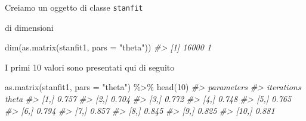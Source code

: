 \documentclass[
  10pt,
  italian,
  a4paper,
  extrafontsizes,onecolumn,openright
  ]{memoir}
\newenvironment{Shaded}{\begin{snugshade}}{\end{snugshade}}
\newcommand{\AttributeTok}[1]{\textcolor[rgb]{0.77,0.63,0.00}{#1}}
\newcommand{\CommentTok}[1]{\textcolor[rgb]{0.56,0.35,0.01}{\textit{#1}}}
\newcommand{\DecValTok}[1]{\textcolor[rgb]{0.00,0.00,0.81}{#1}}
\newcommand{\FunctionTok}[1]{\textcolor[rgb]{0.00,0.00,0.00}{#1}}
\newcommand{\NormalTok}[1]{#1}
\newcommand{\OtherTok}[1]{\textcolor[rgb]{0.56,0.35,0.01}{#1}}
\newcommand{\SpecialCharTok}[1]{\textcolor[rgb]{0.00,0.00,0.00}{#1}}
\newcommand{\StringTok}[1]{\textcolor[rgb]{0.31,0.60,0.02}{#1}}
\begin{document}
\begin{Shaded}
\end{Shaded}

Creiamo un oggetto di classe \texttt{stanfit}

\begin{Shaded}
\end{Shaded}

\noindent
di dimensioni

\begin{Shaded}
\begin{Highlighting}[]
\FunctionTok{dim}\NormalTok{(}\FunctionTok{as.matrix}\NormalTok{(stanfit1, }\AttributeTok{pars =} \StringTok{"theta"}\NormalTok{))}
\CommentTok{\#\textgreater{} [1] 16000     1}
\end{Highlighting}
\end{Shaded}

\noindent
I primi 10 valori sono presentati qui di seguito

\begin{Shaded}
\begin{Highlighting}[]
\FunctionTok{as.matrix}\NormalTok{(stanfit1, }\AttributeTok{pars =} \StringTok{"theta"}\NormalTok{) }\SpecialCharTok{\%\textgreater{}\%} 
  \FunctionTok{head}\NormalTok{(}\DecValTok{10}\NormalTok{)}
\CommentTok{\#\textgreater{}           parameters}
\CommentTok{\#\textgreater{} iterations theta}
\CommentTok{\#\textgreater{}       [1,] 0.757}
\CommentTok{\#\textgreater{}       [2,] 0.704}
\CommentTok{\#\textgreater{}       [3,] 0.772}
\CommentTok{\#\textgreater{}       [4,] 0.748}
\CommentTok{\#\textgreater{}       [5,] 0.765}
\CommentTok{\#\textgreater{}       [6,] 0.794}
\CommentTok{\#\textgreater{}       [7,] 0.857}
\CommentTok{\#\textgreater{}       [8,] 0.845}
\CommentTok{\#\textgreater{}       [9,] 0.825}
\CommentTok{\#\textgreater{}      [10,] 0.881}
\end{Highlighting}
\end{Shaded}
\end{document}
